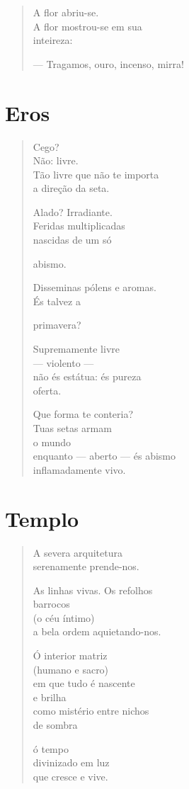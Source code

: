\begin{verse}
A flor abriu-se.\\
A flor mostrou-se em sua\\
\hfill inteireza:

--- Tragamos, ouro, incenso, mirra!
\end{verse}

\chapter{Eros}

\begin{verse}
Cego?\\
Não: livre.\\
Tão livre que não te importa\\
a direção da seta.

Alado? Irradiante.\\
Feridas multiplicadas\\
nascidas de um só

\hfill abismo.

Disseminas pólens e aromas.\\
És talvez a

\hfill primavera?

Supremamente livre\\
\quad\quad\quad --- violento ---\\
não és estátua: és pureza\\
\hfill oferta.

Que forma te conteria?\\
Tuas setas armam\\
\hfill o mundo\\
enquanto --- aberto --- és abismo\\
\hfill inflamadamente vivo.
\end{verse}

\chapter{Templo}

\begin{verse}
A severa arquitetura\\
serenamente prende-nos.

As linhas vivas. Os refolhos\\
\quad\quad\quad\quad barrocos\\
\quad\quad(o céu íntimo)\\
a bela ordem aquietando-nos.

Ó interior matriz\\
(humano e sacro)\\
em que tudo é nascente\\
\quad\quad\quad\quad e brilha\\
como mistério entre nichos\\
\quad\quad\quad\quad de sombra

ó tempo\\
divinizado em luz\\
que cresce e vive.
\end{verse}

